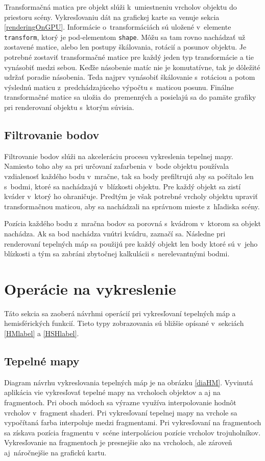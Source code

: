 Transformačná matica pre objekt slúži k~umiestneniu vrcholov objektu do priestoru scény. Vykresľovaniu dát na grafickej karte sa venuje sekcia \ref{renderingOnGPU}. Informácie o~transformáciách sú uložené v~elemente \verb|transform|, ktorý je pod-elementom \verb|shape|. Môžu sa tam rovno nachádzať už zostavené matice, alebo len postupy škálovania, rotácií a posunov objektu. Je potrebné zostaviť transformačné matice pre každý jeden typ transformácie a tie vynásobiť medzi sebou. Keďže násobenie matíc nie je komutatívne, tak je dôležité udržať poradie násobenia. Teda najprv vynásobiť škálovanie s~rotáciou a potom výslednú maticu z~predchádzajúceho výpočtu s~maticou posunu. Finálne transformačné matice sa uložia do~premenných a posielajú sa do pamäte grafiky pri renderovaní objektu s~ktorým súvisia. 

\subsection*{Filtrovanie bodov}
\label{FiltrBodovNavrh}
Filtrovanie bodov slúži na akceleráciu procesu vykreslenia tepelnej mapy. Namiesto toho aby sa pri určovaní zafarbenia v~bode objektu používala vzdialenosť každého bodu v~mračne, tak sa body prefiltrujú aby sa počítalo len s~bodmi, ktoré sa nachádzajú v~blízkosti objektu. Pre každý objekt sa zistí kváder v~ktorý ho ohraničuje. Predtým je však potrebné vrcholy objektu upraviť transformačnou maticou, aby sa nachádzali na správnom mieste z~hľadiska scény.

Pozícia každého bodu z~mračna bodov sa porovná s~kvádrom v~ktorom sa objekt nachádza. Ak sa bod nachádza vnútri kvádru, zaznačí sa. Následne pri renderovaní tepelných máp sa použijú pre každý objekt len body ktoré sú v~jeho blízkosti a tým sa zabráni zbytočnej kalkulácii s~nerelevantnými bodmi.
\section{Operácie na vykreslenie}
\label{OperationsNavrh}
Táto sekcia sa zaoberá návrhmi operácií pri vykresľovaní tepelných máp a hemisférických funkcií. Tieto typy zobrazovania sú bližšie opísané v~sekciách \ref{HMlabel} a \ref{HSHlabel}. 
\subsection*{Tepelné mapy}
\label{HMNavrh}
Diagram návrhu vykreslovania tepelných máp je na obrázku \ref{diaHM}. Vyvinutá aplikácia vie vykresľovať tepelné mapy na vrcholoch objektov a aj na fragmentoch. Pri oboch módoch sa výrazne využíva interpolovanie hodnôt vrcholov v~fragment shaderi. Pri vykresľovaní tepelnej mapy na vrchole sa vypočítaná farba interpoluje medzi fragmentami. Pri vykresľovaní na fragmentoch sa získava pozícia fragmentu v~scéne interpoláciou pozície vrcholov trojuholníkov. Vykresľovanie na fragmentoch je presnejšie ako na vrcholoch, ale zároveň aj~náročnejšie na grafickú kartu.

